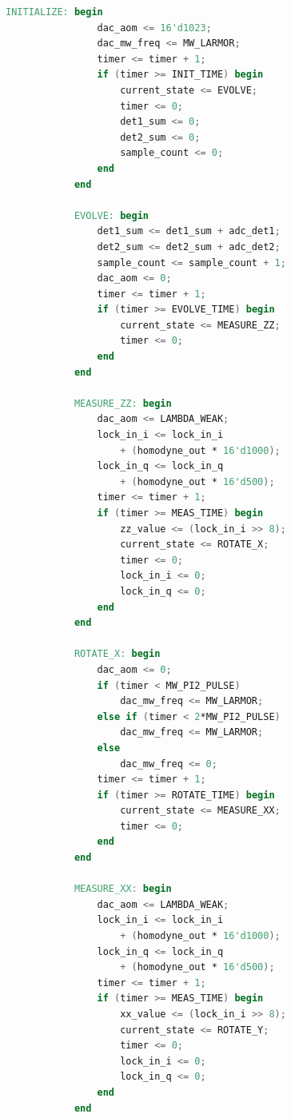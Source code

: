 \documentclass[11pt,a4paper,openany]{book}
\begin{document}
\begin{lstlisting}[language=Verilog,caption={weak\_measurement\_controller.v --- FPGA state machine}]
            INITIALIZE: begin
                dac_aom <= 16'd1023;
                dac_mw_freq <= MW_LARMOR;
                timer <= timer + 1;
                if (timer >= INIT_TIME) begin
                    current_state <= EVOLVE;
                    timer <= 0;
                    det1_sum <= 0;
                    det2_sum <= 0;
                    sample_count <= 0;
                end
            end

            EVOLVE: begin
                det1_sum <= det1_sum + adc_det1;
                det2_sum <= det2_sum + adc_det2;
                sample_count <= sample_count + 1;
                dac_aom <= 0;
                timer <= timer + 1;
                if (timer >= EVOLVE_TIME) begin
                    current_state <= MEASURE_ZZ;
                    timer <= 0;
                end
            end

            MEASURE_ZZ: begin
                dac_aom <= LAMBDA_WEAK;
                lock_in_i <= lock_in_i
                    + (homodyne_out * 16'd1000);
                lock_in_q <= lock_in_q
                    + (homodyne_out * 16'd500);
                timer <= timer + 1;
                if (timer >= MEAS_TIME) begin
                    zz_value <= (lock_in_i >> 8);
                    current_state <= ROTATE_X;
                    timer <= 0;
                    lock_in_i <= 0;
                    lock_in_q <= 0;
                end
            end

            ROTATE_X: begin
                dac_aom <= 0;
                if (timer < MW_PI2_PULSE)
                    dac_mw_freq <= MW_LARMOR;
                else if (timer < 2*MW_PI2_PULSE)
                    dac_mw_freq <= MW_LARMOR;
                else
                    dac_mw_freq <= 0;
                timer <= timer + 1;
                if (timer >= ROTATE_TIME) begin
                    current_state <= MEASURE_XX;
                    timer <= 0;
                end
            end

            MEASURE_XX: begin
                dac_aom <= LAMBDA_WEAK;
                lock_in_i <= lock_in_i
                    + (homodyne_out * 16'd1000);
                lock_in_q <= lock_in_q
                    + (homodyne_out * 16'd500);
                timer <= timer + 1;
                if (timer >= MEAS_TIME) begin
                    xx_value <= (lock_in_i >> 8);
                    current_state <= ROTATE_Y;
                    timer <= 0;
                    lock_in_i <= 0;
                    lock_in_q <= 0;
                end
            end


\end{lstlisting}
\end{document}
